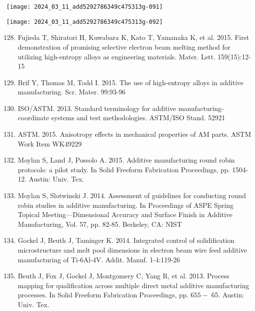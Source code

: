 \documentclass[10pt]{article}
\begin{document}
\begin{center}
\texttt{[image: 2024\_03\_11\_add5292786349c475313g-091]}
\end{center}

\begin{center}
\texttt{[image: 2024\_03\_11\_add5292786349c475313g-092]}
\end{center}

\begin{enumerate}
  \setcounter{enumi}{127}
  \item Fujieda T, Shiratori H, Kuwabara K, Kato T, Yamanaka K, et al. 2015. First demonstration of promising selective electron beam melting method for utilizing high-entropy alloys as engineering materials. Mater. Lett. 159(15):12-15

  \item Brif Y, Thomas M, Todd I. 2015. The use of high-entropy alloys in additive manufacturing. Scr. Mater. 99:93-96

  \item ISO/ASTM. 2013. Standard terminology for additive manufacturing-coordinate systems and test methodologies. ASTM/ISO Stand. 52921

  \item ASTM. 2015. Anisotropy effects in mechanical properties of AM parts. ASTM Work Item WK49229

  \item Moylan S, Land J, Possolo A. 2015. Additive manufacturing round robin protocols: a pilot study. In Solid Freeform Fabrication Proceedings, pp. 1504-12. Austin: Univ. Tex.

  \item Moylan S, Slotwinski J. 2014. Assessment of guidelines for conducting round robin studies in additive manufacturing. In Proceedings of ASPE Spring Topical Meeting—Dimensional Accuracy and Surface Finish in Additive Manufacturing, Vol. 57, pp. 82-85. Berkeley, CA: NIST

  \item Gockel J, Beuth J, Taminger K. 2014. Integrated control of solidification microstructure and melt pool dimensions in electron beam wire feed additive manufacturing of Ti-6Al-4V. Addit. Manuf. 1-4:119-26

  \item Beuth J, Fox J, Gockel J, Montgomery C, Yang R, et al. 2013. Process mapping for qualification across multiple direct metal additive manufacturing processes. In Solid Freeform Fabrication Proceedings, pp. $655-$ 65. Austin: Univ. Tex.


\end{enumerate}
\end{document}

